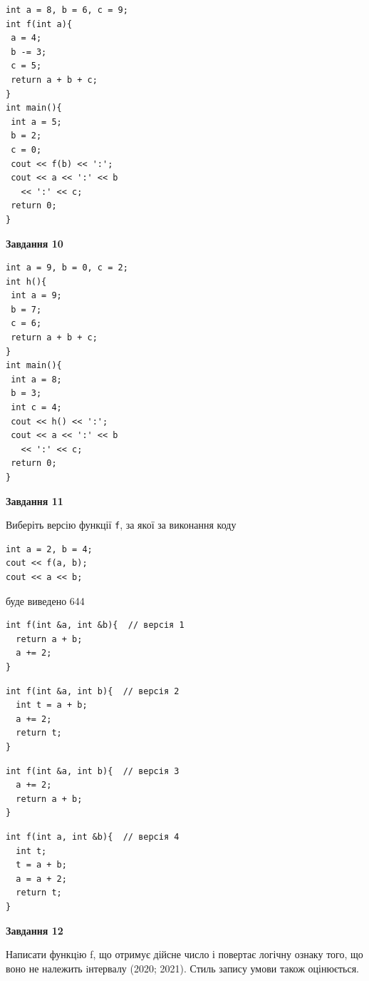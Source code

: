 \documentclass[12pt, ukrainian]{article}
\def\code#1{\Verb!#1!}
\begin{document}
{\begin {large}
\begin{minipage}[t]{7.0cm}
\begin{verbatim}
int a = 8, b = 6, c = 9;
int f(int a){
 a = 4;
 b -= 3;
 c = 5;
 return a + b + c;
}
int main(){
 int a = 5;
 b = 2;
 c = 0;
 cout << f(b) << ':';
 cout << a << ':' << b 
   << ':' << c;
 return 0;
}
\end{verbatim}



\begin{center}
\textbf{Завдання 10}
\end{center}
\vspace{-8mm}

\begin{verbatim}
int a = 9, b = 0, c = 2;
int h(){
 int a = 9;
 b = 7;
 c = 6;
 return a + b + c;
}
int main(){
 int a = 8;
 b = 3;
 int c = 4;
 cout << h() << ':';
 cout << a << ':' << b 
   << ':' << c;
 return 0;
}
\end{verbatim}

\end{minipage}
\vline \hspace{1mm}
\begin{minipage}[t]{11.0cm}

\begin{center}
\textbf{Завдання 11}
\end{center}
Виберіть версію функції \code{f}, за якої за виконання коду
\begin{verbatim}
int a = 2, b = 4;
cout << f(a, b);
cout << a << b;
\end{verbatim}

буде виведено 644

\begin{verbatim}
int f(int &a, int &b){  // версія 1
  return a + b;
  a += 2;
}
\end{verbatim}

\vspace{-8mm}\begin{verbatim}
int f(int &a, int b){  // версія 2
  int t = a + b;
  a += 2;
  return t;
}
\end{verbatim}

\vspace{-8mm}\begin{verbatim}
int f(int &a, int b){  // версія 3
  a += 2;
  return a + b;
}
\end{verbatim}

\vspace{-8mm}\begin{verbatim}
int f(int a, int &b){  // версія 4
  int t;
  t = a + b;
  a = a + 2;
  return t;
}
\end{verbatim}



\begin{center}
\textbf{Завдання 12}
\end{center}

Написати функцiю f, що отримує дійсне число і повертає логічну ознаку того, що воно не належить iнтервалу (2020; 2021). Стиль запису умови також оцінюється.\par

\end{minipage}

\end {large}}
\end{document}
